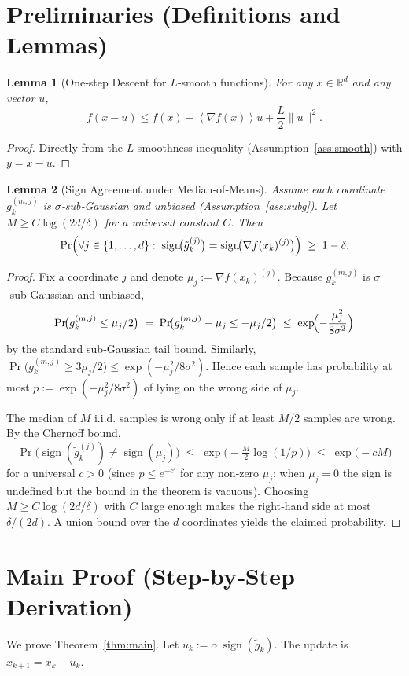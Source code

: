 \documentclass{article}
\newtheorem{lemma}{Lemma}
\newcommand{\R}{\mathbb{R}}
\newcommand{\sign}{\operatorname{sign}}
\newcommand{\inner}[1]{\left\langle#1\right\rangle}
\begin{document}
\section*{Preliminaries (Definitions and Lemmas)}
\begin{lemma}[One‑step Descent for $L$‑smooth functions]\label{lem:descent}
For any $x\in\R^{d}$ and any vector $u$,
\[
f(x-u)\le f(x)-\inner{\nabla f(x)}{u}+\frac{L}{2}\|u\|^{2}.
\]
\end{lemma}
\begin{proof}
Directly from the $L$‑smoothness inequality (Assumption~\ref{ass:smooth}) with $y=x-u$.
\end{proof}

\begin{lemma}[Sign Agreement under Median‑of‑Means]\label{lem:sign}
Assume each coordinate $g_k^{(m,j)}$ is $\sigma$‑sub‑Gaussian and unbiased
(Assumption~\ref{ass:subg}).  Let $M\ge C\log(2d/\delta)$ for a universal
constant $C$.  Then
\[
\Pr\Bigl(\forall j\in\{1,\dots,d\}:\;
\sign\!\bigl(\tilde{g}_k^{(j)}\bigr)=\sign\!\bigl(\nabla f(x_k)^{(j)}\bigr)\Bigr)
\;\ge\;1-\delta .
\]
\end{lemma}
\begin{proof}
Fix a coordinate $j$ and denote $\mu_j:=\nabla f(x_k)^{(j)}$.
Because $g_k^{(m,j)}$ is $\sigma$‑sub‑Gaussian and unbiased,
\[
\Pr\!\bigl(g_k^{(m,j)}\le \mu_j/2\bigr)
\;=\;
\Pr\!\bigl(g_k^{(m,j)}-\mu_j\le -\mu_j/2\bigr)
\;\le\;
\exp\!\Bigl(-\frac{\mu_j^{2}}{8\sigma^{2}}\Bigr)
\]
by the standard sub‑Gaussian tail bound.
Similarly,
$\Pr\!\bigl(g_k^{(m,j)}\ge 3\mu_j/2\bigr)\le\exp(-\mu_j^{2}/8\sigma^{2})$.
Hence each sample has probability at most $p:=\exp(-\mu_j^{2}/8\sigma^{2})$ of
lying on the wrong side of $\mu_j$.

The median of $M$ i.i.d. samples is wrong only if at least $M/2$ samples are
wrong.  By the Chernoff bound,
\[
\Pr\!\bigl(\sign(\tilde{g}_k^{(j)})\neq\sign(\mu_j)\bigr)
\;\le\;
\exp\!\bigl(-\tfrac{M}{2}\log(1/p)\bigr)
\;\le\;
\exp\!\bigl(-cM\bigr)
\]
for a universal $c>0$ (since $p\le e^{-c'}$ for any non‑zero $\mu_j$; when
$\mu_j=0$ the sign is undefined but the bound in the theorem is vacuous).
Choosing $M\ge C\log(2d/\delta)$ with $C$ large enough makes the
right‑hand side at most $\delta/(2d)$.  A union bound over the $d$
coordinates yields the claimed probability.
\end{proof}

\section*{Main Proof (Step‑by‑Step Derivation)}
We prove Theorem~\ref{thm:main}.  Let $u_k:=\alpha\,\sign(\tilde{g}_k)$.  The update is $x_{k+1}=x_k-u_k$.
\end{document}
